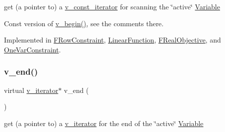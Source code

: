 get (a pointer to) a \mbox{\hyperlink{class_s_m_spp__di__unipi__it_1_1_thin_var_dep_interface_1_1v__const__iterator}{v\+\_\+const\+\_\+iterator}} for scanning the \char`\"{}active\char`\"{} \mbox{\hyperlink{class_s_m_spp__di__unipi__it_1_1_variable}{Variable}} 

Const version of \mbox{\hyperlink{group___thin_var_dep_interface___c_l_a_s_s_e_s_ga645ab1f1a40dea7fdcef536081c78613}{v\+\_\+begin()}}, see the comments there. 

Implemented in \mbox{\hyperlink{class_s_m_spp__di__unipi__it_1_1_f_row_constraint_a997de10fbae309ac6e357d7ad96a8052}{F\+Row\+Constraint}}, \mbox{\hyperlink{class_s_m_spp__di__unipi__it_1_1_linear_function_a70fe7515b94b3bb0c315ed6794f97a9a}{Linear\+Function}}, \mbox{\hyperlink{class_s_m_spp__di__unipi__it_1_1_f_real_objective_a997de10fbae309ac6e357d7ad96a8052}{F\+Real\+Objective}}, and \mbox{\hyperlink{class_s_m_spp__di__unipi__it_1_1_one_var_constraint_a997de10fbae309ac6e357d7ad96a8052}{One\+Var\+Constraint}}.

\mbox{\label{group___thin_var_dep_interface___c_l_a_s_s_e_s_ga422dd4393326b2da21dbef0aa0a85bee}} 
\subsubsection{\texorpdfstring{v\+\_\+end()}{v\_end()}\hspace{0.1cm}{\footnotesize\ttfamily [1/2]}}
{\footnotesize\ttfamily virtual \mbox{\hyperlink{class_s_m_spp__di__unipi__it_1_1_thin_var_dep_interface_1_1v__iterator}{v\+\_\+iterator}}$\ast$ v\+\_\+end (\begin{DoxyParamCaption}\item[{void}]{ }\end{DoxyParamCaption})\hspace{0.3cm}{\ttfamily [pure virtual]}}



get (a pointer to) a \mbox{\hyperlink{class_s_m_spp__di__unipi__it_1_1_thin_var_dep_interface_1_1v__iterator}{v\+\_\+iterator}} for the end of the \char`\"{}active\char`\"{} \mbox{\hyperlink{class_s_m_spp__di__unipi__it_1_1_variable}{Variable}} 

